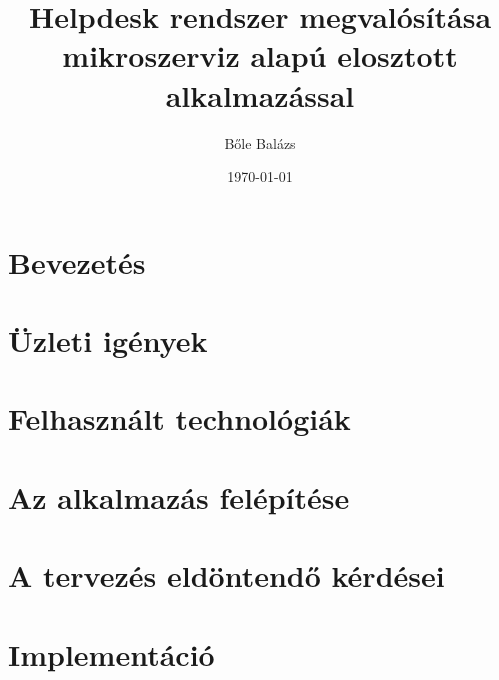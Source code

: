 


\title{\foreignlanguage{british}{Helpdesk} rendszer megvalósítása mikroszerviz alapú elosztott alkalmazással}
\author{Bőle Balázs}
\date{\today}
\graphicspath{{Figs/}}  %


\sloppy
{}
\makeatletter  %

\makeatother

\clearpage


\pagestyle{front}
\tableofcontents

\begingroup
\let\clearpage\relax
\listoffigures
\endgroup


\clearpage
{}
\chapter*{Bevezetés}\label{ch:bevezetes}



\chapter{Üzleti igények}\label{ch:uzleti_igenyek}
\pagestyle{main}



\chapter[Technológiai áttekintés]{Felhasznált technológiák}\label{ch:felhasznalt_technologiak}
\pagestyle{main}



\chapter{Az alkalmazás felépítése}\label{ch:felepites}
\pagestyle{main}



\chapter[Technikai tervezés]{A tervezés eldöntendő kérdései}
\pagestyle{main}



\chapter{Implementáció}\label{ch:implementacio}
\pagestyle{main}



